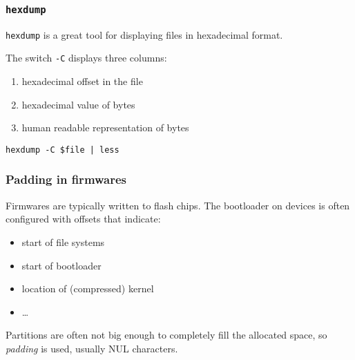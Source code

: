 \documentclass[11pt]{beamer}
\begin{document}
\begin{frame}[fragile]
\frametitle{\texttt{hexdump}}

\texttt{hexdump} is a great tool for displaying files in hexadecimal format.

The switch \texttt{-C} displays three columns:

\begin{enumerate}
\item hexadecimal offset in the file
\item hexadecimal value of bytes
\item human readable representation of bytes
\end{enumerate}

\texttt{hexdump -C \$file | less}

{\scriptsize\color{blue}{
\begin{verbatim}
00000000  48 44 52 30 00 10 21 00  0a 07 eb 3d 00 00 01 00  |HDR0..!....=....|
00000010  1c 00 00 00 04 09 00 00  00 b4 07 00 1f 8b 08 00  |................|
00000020  00 00 00 00 02 03 a5 57  4d 6c 5b 59 19 3d be ef  |.......WMl[Y.=..|
\end{verbatim}
}}
\end{frame}


\begin{frame}[fragile]
\frametitle{Padding in firmwares}
Firmwares are typically written to flash chips. The bootloader on devices is often configured with offsets that indicate:

\begin{itemize}
\item start of file systems
\item start of bootloader
\item location of (compressed) kernel
\item \dots
\end{itemize}

Partitions are often not big enough to completely fill the allocated space, so \textit{padding} is used, usually NUL characters.
{\scriptsize\color{blue}{
\begin{verbatim}
0007b130  00 00 00 00 00 00 00 00  00 00 00 00 00 00 00 00  |................|
\end{verbatim}
}}
\end{frame}
\end{document}
